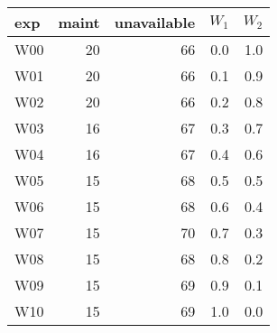 \begin{tabular}{lrrrr}
\toprule
 exp &  maint &  unavailable &  $W_1$ &  $W_2$ \\
\midrule
 W00 &     20 &           66 &    0.0 &    1.0 \\
 W01 &     20 &           66 &    0.1 &    0.9 \\
 W02 &     20 &           66 &    0.2 &    0.8 \\
 W03 &     16 &           67 &    0.3 &    0.7 \\
 W04 &     16 &           67 &    0.4 &    0.6 \\
 W05 &     15 &           68 &    0.5 &    0.5 \\
 W06 &     15 &           68 &    0.6 &    0.4 \\
 W07 &     15 &           70 &    0.7 &    0.3 \\
 W08 &     15 &           68 &    0.8 &    0.2 \\
 W09 &     15 &           69 &    0.9 &    0.1 \\
 W10 &     15 &           69 &    1.0 &    0.0 \\
\bottomrule
\end{tabular}
